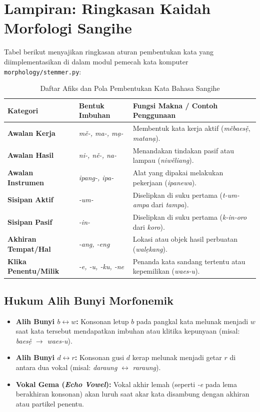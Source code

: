 \chapter{Lampiran: Ringkasan Kaidah Morfologi Sangihe}

Tabel berikut menyajikan ringkasan aturan pembentukan kata yang diimplementasikan di dalam modul pemecah kata komputer \texttt{morphology/stemmer.py}:

\begin{table}[htbp]
\centering
\caption{Daftar Afiks dan Pola Pembentukan Kata Bahasa Sangihe}
\label{tab:affixes}
\begin{tabularx}{\textwidth}{llX}
\toprule
\textbf{Kategori} & \textbf{Bentuk Imbuhan} & \textbf{Fungsi Makna / Contoh Penggunaan} \\
\midrule
\textbf{Awalan Kerja} & \textit{m\v{e}-, ma-, m\d{a}-} & Membentuk kata kerja aktif (\textit{m\v{e}baes\v{\d{e}}}, \textit{matan\d{a}}). \\
\textbf{Awalan Hasil} & \textit{ni-, n\v{e}-, na-} & Menandakan tindakan pasif atau lampau (\textit{niw\v{e}liang}). \\
\textbf{Awalan Instrumen} & \textit{ipang-, ipa-} & Alat yang dipakai melakukan pekerjaan (\textit{ipanewa}). \\
\textbf{Sisipan Aktif} & \textit{-um-} & Diselipkan di suku pertama (\textit{t-um-ampa} dari \textit{tampa}). \\
\textbf{Sisipan Pasif} & \textit{-in-} & Diselipkan di suku pertama (\textit{k-in-oro} dari \textit{koro}). \\
\textbf{Akhiran Tempat/Hal} & \textit{-ang, -eng} & Lokasi atau objek hasil perbuatan (\textit{wal\d{e}kang}). \\
\textbf{Klika Penentu/Milik} & \textit{-e, -u, -ku, -ne} & Penanda kata sandang tertentu atau kepemilikan (\textit{waes-u}). \\
\bottomrule
\end{tabularx}
\end{table}

\section*{Hukum Alih Bunyi Morfonemik}
\begin{itemize}
    \item \textbf{Alih Bunyi $b \leftrightarrow w$:} Konsonan letup $b$ pada pangkal kata melunak menjadi $w$ saat kata tersebut mendapatkan imbuhan atau klitika kepunyaan (misal: \textit{baes\v{\d{e}}} $\rightarrow$ \textit{waes-u}).
    \item \textbf{Alih Bunyi $d \leftrightarrow r$:} Konsonan gusi $d$ kerap melunak menjadi getar $r$ di antara dua vokal (misal: \textit{daraung} $\leftrightarrow$ \textit{raraung}).
    \item \textbf{Vokal Gema (\textit{Echo Vowel}):} Vokal akhir lemah (seperti \textit{-e} pada lema berakhiran konsonan) akan luruh saat akar kata disambung dengan akhiran atau partikel penentu.
\end{itemize}
